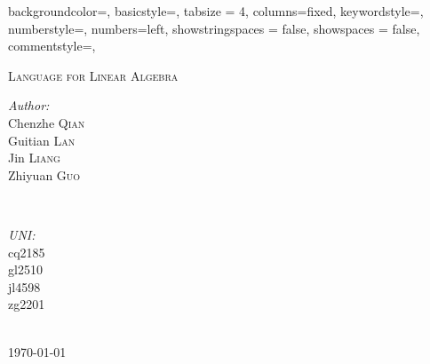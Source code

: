 \documentclass[12pt]{article} %
\begin{document}


{backgroundcolor=\color{lbcolor},
	basicstyle=\tiny,
	tabsize = 4,
	columns=fixed,
	keywordstyle=\color[rgb]{0,0,1},
	numberstyle=\tiny\color{blue},
	numbers=left,
	showstringspaces = false,
	showspaces = false,
	commentstyle=\color[rgb]{0.133,0.545,0.133},
}

\begin{titlepage}

\newcommand{\HRule}{\rule{\linewidth}{0.5mm}} %

\center %

\textsc{\LARGE Language for Linear Algebra}\\[1.0cm] %


\begin{minipage}{0.4\textwidth}
\begin{flushleft} \large
\emph{Author:}\\
Chenzhe \textsc{Qian} \\
Guitian \textsc{Lan} \\
Jin \textsc{Liang} \\
Zhiyuan \textsc{Guo}
\end{flushleft}
\end{minipage}
~
\begin{minipage}{0.4\textwidth}
\begin{flushright} \large
\emph{UNI:} \\
cq2185 \\
gl2510 \\
jl4598 \\
zg2201
\end{flushright}
\end{minipage}\\[4cm]

{\large \today}\\[3cm] %


\vfill %

\end{titlepage}
\end{document}
